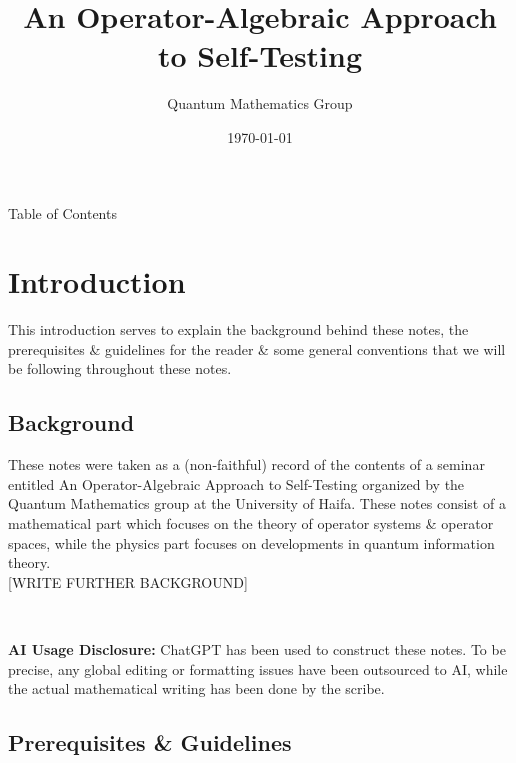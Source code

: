 \documentclass[preamble.tex]{subfiles}
\begin{document}
\title{\huge\sffamily\bfseries An Operator-Algebraic Approach to Self-Testing}
\author{\large\sffamily Quantum Mathematics Group}
\date{\sffamily \today}

\maketitle
\thispagestyle{plain}

\begin{contents}[colbacktitle=Periwinkle]{\large Table of Contents}
\makeatletter
{}
\makeatother
\end{contents}

\newpage 
\section{Introduction}\label{sec: introduction}

This introduction serves to explain the background behind these notes, the prerequisites \& guidelines for the reader \& some general conventions that we will be following throughout these notes. 

\subsection{Background}\label{subsec: background}

These notes were taken as a (non-faithful) record of the contents of a seminar entitled An Operator-Algebraic Approach to Self-Testing organized by the Quantum Mathematics group at the University of Haifa. These notes consist of a mathematical part which focuses on the theory of operator systems \& operator spaces, while the physics part focuses on developments in quantum information theory.\\ 

[WRITE FURTHER BACKGROUND]

\ 

\textbf{AI Usage Disclosure:} ChatGPT has been used to construct these notes. To be precise, any global editing or formatting issues have been outsourced to AI, while the actual mathematical writing has been done by the scribe. 

\subsection{Prerequisites \& Guidelines}\label{subsec: prereqs and guidelines}
\end{document}
